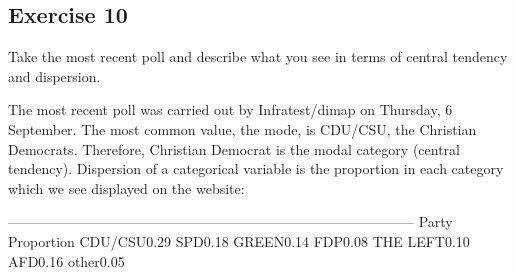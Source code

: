 \documentclass[]{book}
\theoremstyle{definition}
\theoremstyle{definition}
\theoremstyle{definition}
\theoremstyle{remark}
\begin{document}
\subsection{Exercise 10}\label{exercise-10}

Take the most recent poll and describe what you see in terms of central
tendency and dispersion.

The most recent poll was carried out by Infratest/dimap on Thursday, 6
September. The most common value, the mode, is CDU/CSU, the Christian
Democrats. Therefore, Christian Democrat is the modal category (central
tendency). Dispersion of a categorical variable is the proportion in
each category which we see displayed on the website:

\textbar{}-----------------------------------------------------------------\textbar{}-----------------------\textbar{}
\textbar{}Party \textbar{}Proportion\textbar{}
\textbar{}CDU/CSU\textbar{}0.29\textbar{}
\textbar{}SPD\textbar{}0.18\textbar{}
\textbar{}GREEN\textbar{}0.14\textbar{}
\textbar{}FDP\textbar{}0.08\textbar{} \textbar{}THE
LEFT\textbar{}0.10\textbar{} \textbar{}AFD\textbar{}0.16\textbar{}
\textbar{}other\textbar{}0.05\textbar{}
\end{document}
